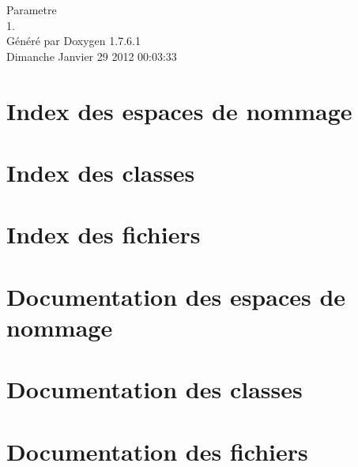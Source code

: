 \documentclass[a4paper]{book}
\begin{document}
\begin{titlepage}
\vspace*{7cm}
\begin{center}
{\Large \-Parametre \\[1ex]\large 1. }\\
\vspace*{1cm}
{\large \-Généré par Doxygen 1.7.6.1}\\
\vspace*{0.5cm}
{\small Dimanche Janvier 29 2012 00:03:33}\\
\end{center}
\end{titlepage}
\clearemptydoublepage
{}
\tableofcontents
\clearemptydoublepage
{}
\chapter{\-Index des espaces de nommage}

\chapter{\-Index des classes}

\chapter{\-Index des fichiers}

\chapter{\-Documentation des espaces de nommage}


\chapter{\-Documentation des classes}











\chapter{\-Documentation des fichiers}








\printindex
\end{document}
